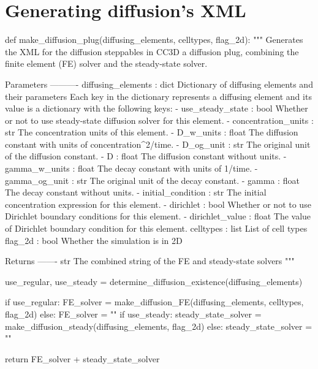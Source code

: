 \section{Generating diffusion's XML}\label{code:trans:diff-xml-gen}

\begin{python}
def make_diffusion_plug(diffusing_elements, celltypes, flag_2d):
    """
    Generates the XML for the diffusion steppables in CC3D a diffusion plug, combining the finite element (FE) solver
    and the steady-state solver.

    Parameters
    ----------
    diffusing_elements : dict
        Dictionary of diffusing elements and their parameters
        Each key in the dictionary represents a diffusing element and its value is a dictionary with the following keys:
        - use_steady_state : bool
            Whether or not to use steady-state diffusion solver for this element.
        - concentration_units : str
            The concentration units of this element.
        - D_w_units : float
            The diffusion constant with units of concentration^2/time.
        - D_og_unit : str
            The original unit of the diffusion constant.
        - D : float
            The diffusion constant without units.
        - gamma_w_units : float
            The decay constant with units of 1/time.
        - gamma_og_unit : str
            The original unit of the decay constant.
        - gamma : float
            The decay constant without units.
        - initial_condition : str
            The initial concentration expression for this element.
        - dirichlet : bool
            Whether or not to use Dirichlet boundary conditions for this element.
        - dirichlet_value : float
            The value of Dirichlet boundary condition for this element.
    celltypes : list
        List of cell types
    flag_2d : bool
        Whether the simulation is in 2D

    Returns
    -------
    str
        The combined string of the FE and steady-state solvers
    """

    use_regular, use_steady = determine_diffusion_existence(diffusing_elements)

    if use_regular:
        FE_solver = make_diffusion_FE(diffusing_elements, celltypes, flag_2d)
    else:
        FE_solver = ""
    if use_steady:
        steady_state_solver = make_diffusion_steady(diffusing_elements, flag_2d)
    else:
        steady_state_solver = ""

    return FE_solver + steady_state_solver
\end{python}

